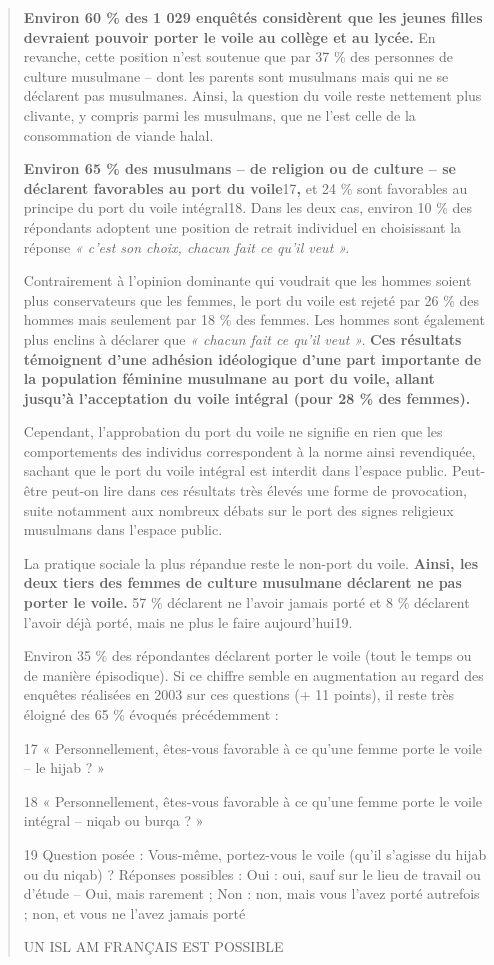 \begin{quote}
\textbf{Environ 60 \% des 1 029 enquêtés considèrent que les jeunes
filles devraient pouvoir porter le voile au collège et au lycée.} En
revanche, cette position n'est soutenue que par 37 \% des personnes de
culture musulmane -- dont les parents sont musulmans mais qui ne se
déclarent pas musulmanes. Ainsi, la question du voile reste nettement
plus clivante, y compris parmi les musulmans, que ne l'est celle de la
consommation de viande halal.

\textbf{Environ 65 \% des musulmans -- de religion ou de culture -- se
déclarent favorables au port du voile}17\textbf{,} et 24 \% sont
favorables au principe du port du voile intégral18. Dans les deux cas,
environ 10 \% des répondants adoptent une position de retrait individuel
en choisissant la réponse \emph{« c'est son choix, chacun fait ce qu'il
veut ».}

Contrairement à l'opinion dominante qui voudrait que les hommes soient
plus conservateurs que les femmes, le port du voile est rejeté par 26 \%
des hommes mais seulement par 18 \% des femmes. Les hommes sont
également plus enclins à déclarer que \emph{« chacun fait ce qu'il veut
».} \textbf{Ces résultats témoignent d'une adhésion idéologique d'une
part importante de la population féminine musulmane au port du voile,
allant jusqu'à l'acceptation du voile intégral (pour 28 \% des femmes).}

Cependant, l'approbation du port du voile ne signifie en rien que les
comportements des individus correspondent à la norme ainsi revendiquée,
sachant que le port du voile intégral est interdit dans l'espace public.
Peut-être peut-on lire dans ces résultats très élevés une forme de
provocation, suite notamment aux nombreux débats sur le port des signes
religieux musulmans dans l'espace public.

La pratique sociale la plus répandue reste le non-port du voile.
\textbf{Ainsi, les deux tiers des femmes de culture musulmane déclarent
ne pas porter le voile.} 57 \% déclarent ne l'avoir jamais porté et 8 \%
déclarent l'avoir déjà porté, mais ne plus le faire aujourd'hui19.

Environ 35 \% des répondantes déclarent porter le voile (tout le temps
ou de manière épisodique). Si ce chiffre semble en augmentation au
regard des enquêtes réalisées en 2003 sur ces questions (+ 11 points),
il reste très éloigné des 65 \% évoqués précédemment :

17 « Personnellement, êtes-vous favorable à ce qu'une femme porte le
voile -- le hijab ? »

18 « Personnellement, êtes-vous favorable à ce qu'une femme porte le
voile intégral -- niqab ou burqa ? »

19 Question posée : Vous-même, portez-vous le voile (qu'il s'agisse du
hijab ou du niqab) ? Réponses possibles : Oui : oui, sauf sur le lieu de
travail ou d'étude -- Oui, mais rarement ; Non : non, mais vous l'avez
porté autrefois ; non, et vous ne l'avez jamais porté

UN ISL AM FRANÇAIS EST POSSIBLE
\end{quote}

